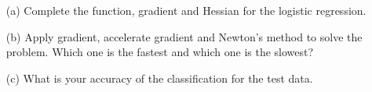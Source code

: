 \documentclass[11pt]{amsart}
\newcommand{\prox}{\mathrm{prox}}
\begin{document}
\begin{enumerate}
\vskip 16pt
\begin{enumerate}
\item[(a)] Complete the function, gradient and Hessian for the logistic regression.
\bigskip
\item[(b)] Apply gradient, accelerate gradient and Newton's method to solve the problem. Which one is the fastest and which one is the slowest?
\bigskip
\item[(c)] What is your accuracy of the classification for the test data.
\end{enumerate}

\end{enumerate}


%
%
%
%
%
%
%
%
%
%
%
%
\end{document}
